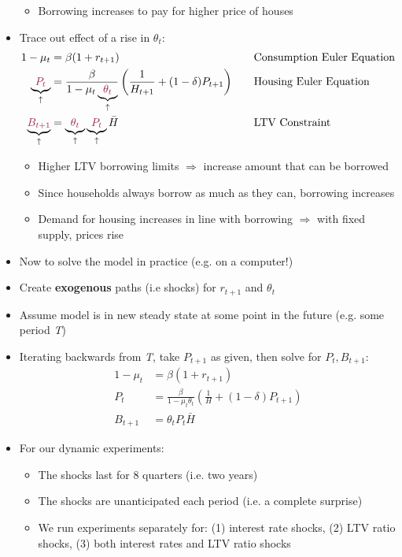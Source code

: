 \documentclass[a4paper,twoside]{article}
\newif\IfInSansMode
\numberwithin{equation}{section}
\numberwithin{figure}{section}
\begin{document}
\begin{itemize}
\begin{itemize}
			\item Borrowing increases to pay for higher price of houses
		\end{itemize}
		\item Trace out effect of a rise in \textcolor{myred}{\( \theta_t \)}:
		\begin{alignat*}{2}
			1-\mu_t&=\beta(1+r_{t+1}) &&\text{Consumption Euler Equation}\\
			\underbrace{\textcolor{myred}{P_t}}_\uparrow&=\frac{\beta}{1-\mu_t\underbrace{\textcolor{myred}{\theta_t}}_\uparrow}\left( \frac{1}{H_{t+1}} + (1-\delta)P_{t+1} \right)\quad &&\text{Housing Euler Equation}\\
			\underbrace{\textcolor{myred}{B_{t+1}}}_\uparrow&=\underbrace{\textcolor{myred}{\theta_t}}_\uparrow\underbrace{\textcolor{myred}{P_t}}_\uparrow\bar{H} &&\text{LTV Constraint} 
		\end{alignat*}
		\begin{itemize}
			\item Higher LTV borrowing limits \( \Rightarrow \) increase amount that can be borrowed
			\item Since households always borrow as much as they can, borrowing increases
			\item Demand for housing increases in line with borrowing \( \Rightarrow \) with fixed supply, prices rise
		\end{itemize}
		\item Now to solve the model in practice (e.g. on a computer!)
		\item Create \textbf{exogenous} paths (i.e shocks) for \( r_{t+1} \) and \( \theta_t \)
		\item Assume model is in new steady state at some point in the future (e.g. some period \textit{T})
		\item Iterating backwards from \textit{T}, take \( P_{t+1} \) as given, then solve for \( P_t,B_{t+1} \):
		\begin{align*}
			1- \mu_t &= \beta(1+r_{t+1}) \\
			P_t &= \frac{\beta}{1-\mu_t\theta_t}\left( \frac{1}{H} + (1-\delta)P_{t+1} \right)\\
			B_{t+1} &= \theta_tP_t\bar{H}
		\end{align*}
		\item For our dynamic experiments:
		\begin{itemize}
			\item The shocks last for 8 quarters (i.e. two years)
			\item The shocks are unanticipated each period (i.e. a complete surprise)
			\item We run experiments separately for: (1) interest rate shocks, (2) LTV ratio shocks, (3) both interest rates and LTV ratio shocks
		\end{itemize}
	\end{itemize}
\end{document}
